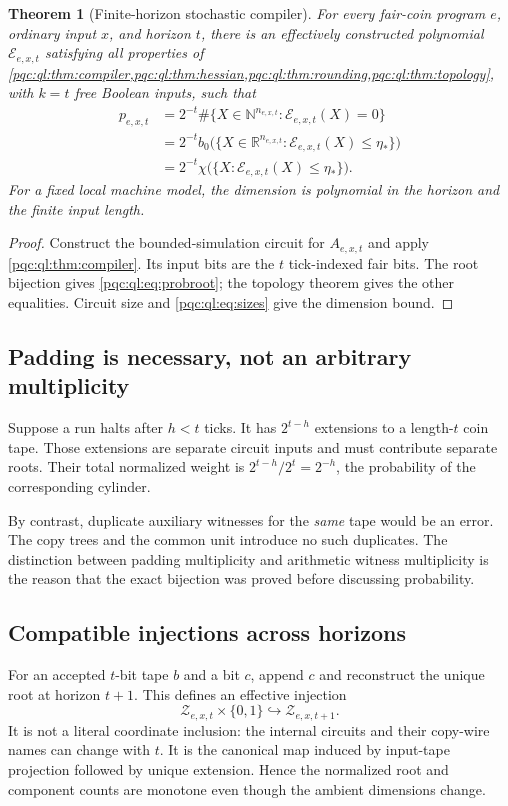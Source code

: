 \documentclass[11pt,letterpaper]{article}
\numberwithin{equation}{section}
\newtheorem{theorem}{Theorem}[section]
\theoremstyle{definition}
\theoremstyle{remark}
\newcommand{\N}{\mathbb N}
\newcommand{\R}{\mathbb R}
\newcommand{\Bit}{\{0,1\}}
\newcommand{\cE}{\mathcal E}
\newcommand{\cZ}{\mathcal Z}
\newcommand{\etastar}{\eta_*}
\begin{document}
\begin{theorem}[Finite-horizon stochastic compiler]\label{pqc:ql:thm:stochastic}
For every fair-coin program $e$, ordinary input $x$, and horizon $t$, there
is an effectively constructed polynomial $\cE_{e,x,t}$ satisfying all
properties of \cref{pqc:ql:thm:compiler,pqc:ql:thm:hessian,pqc:ql:thm:rounding,pqc:ql:thm:topology}, with
$k=t$ free Boolean inputs, such that
\begin{align}
 p_{e,x,t}
 &=2^{-t}\#\{X\in\N^{n_{e,x,t}}:\cE_{e,x,t}(X)=0\}\label{pqc:ql:eq:probroot}\\
 &=2^{-t}b_0\bigl(\{X\in\R^{n_{e,x,t}}:
               \cE_{e,x,t}(X)\le\etastar\}\bigr)\label{pqc:ql:eq:probbetti}\\
 &=2^{-t}\chi\bigl(\{X:\cE_{e,x,t}(X)\le\etastar\}\bigr).
 \label{pqc:ql:eq:probchi}
\end{align}
For a fixed local machine model, the dimension is polynomial in the
horizon and the finite input length.
\end{theorem}
\begin{proof}
Construct the bounded-simulation circuit for $A_{e,x,t}$ and apply
\cref{pqc:ql:thm:compiler}. Its input bits are the $t$ tick-indexed fair bits.
The root bijection gives \eqref{pqc:ql:eq:probroot}; the topology theorem gives
the other equalities. Circuit size and \eqref{pqc:ql:eq:sizes} give the dimension
bound.
\end{proof}

\subsection{Padding is necessary, not an arbitrary multiplicity}
Suppose a run halts after $h<t$ ticks. It has $2^{t-h}$ extensions to a
length-$t$ coin tape. Those extensions are separate circuit inputs and
must contribute separate roots. Their total normalized weight is
$2^{t-h}/2^t=2^{-h}$, the probability of the corresponding cylinder.

By contrast, duplicate auxiliary witnesses for the \emph{same} tape would
be an error. The copy trees and the common unit introduce no such
duplicates. The distinction between padding multiplicity and arithmetic
witness multiplicity is the reason that the exact bijection was proved
before discussing probability.

\subsection{Compatible injections across horizons}
For an accepted $t$-bit tape $b$ and a bit $c$, append $c$ and reconstruct
the unique root at horizon $t+1$. This defines an effective injection
\[
 \cZ_{e,x,t}\times\Bit\hookrightarrow\cZ_{e,x,t+1}.
\]
It is not a literal coordinate inclusion: the internal circuits and their
copy-wire names can change with $t$. It is the canonical map induced by
input-tape projection followed by unique extension. Hence the normalized
root and component counts are monotone even though the ambient dimensions
change.
\end{document}

